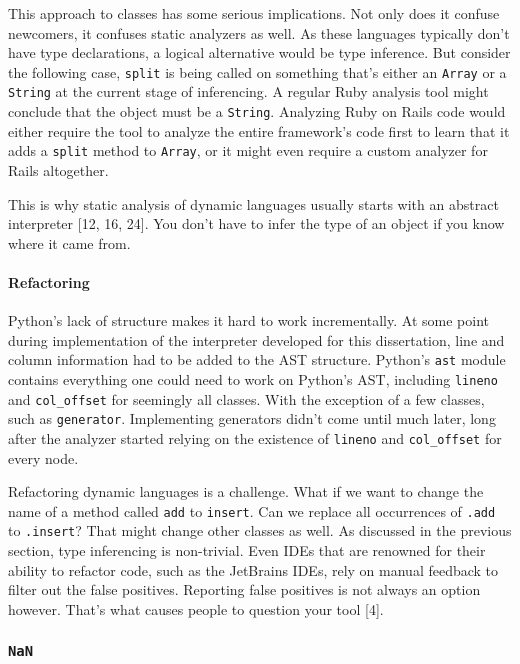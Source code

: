 \documentclass[a4paper, 16pt, oneside]{Thesis}
\let\oldparagraph\paragraph
\renewcommand{\paragraph}[1]{\oldparagraph{#1}\mbox{}}
\begin{document}
This approach to classes has some serious implications. Not only does it
confuse newcomers, it confuses static analyzers as well. As these
languages typically don't have type declarations, a logical alternative
would be type inference. But consider the following case, \texttt{split}
is being called on something that's either an \texttt{Array} or a
\texttt{String} at the current stage of inferencing. A regular Ruby
analysis tool might conclude that the object must be a \texttt{String}.
Analyzing Ruby on Rails code would either require the tool to analyze
the entire framework's code first to learn that it adds a \texttt{split}
method to \texttt{Array}, or it might even require a custom analyzer for
Rails altogether.

This is why static analysis of dynamic languages usually starts with an
abstract interpreter {[}12, 16, 24{]}. You don't have to infer the type
of an object if you know where it came from.

\paragraph{Refactoring}\label{refactoring}

Python's lack of structure makes it hard to work incrementally. At some
point during implementation of the interpreter developed for this
dissertation, line and column information had to be added to the AST
structure. Python's \texttt{ast} module contains everything one could
need to work on Python's AST, including \texttt{lineno} and
\texttt{col\_offset} for seemingly all classes. With the exception of a
few classes, such as \texttt{generator}. Implementing generators didn't
come until much later, long after the analyzer started relying on the
existence of \texttt{lineno} and \texttt{col\_offset} for every node.

Refactoring dynamic languages is a challenge. What if we want to change
the name of a method called \texttt{add} to \texttt{insert}. Can we
replace all occurrences of \texttt{.add} to \texttt{.insert}? That might
change other classes as well. As discussed in the previous section, type
inferencing is non-trivial. Even IDEs that are renowned for their
ability to refactor code, such as the JetBrains IDEs, rely on manual
feedback to filter out the false positives. Reporting false positives is
not always an option however. That's what causes people to question your
tool {[}4{]}.

\subsubsection{\texorpdfstring{\texttt{NaN}}{NaN}}\label{nan}
\end{document}
